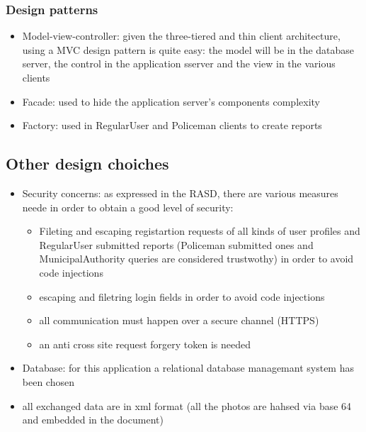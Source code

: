 \subsubsection{Design patterns}
\begin{itemize}
	\item Model-view-controller: given the three-tiered and thin client architecture, using a MVC design pattern is quite easy: the model will be in the database server, the control in the application sserver and the view in the various clients
	\item Facade: used to hide the application server's components complexity
	\item Factory: used in RegularUser and Policeman clients to create reports
\end{itemize}
\subsection{Other design choiches}
\begin{itemize}
	\item Security concerns: as expressed in the RASD, there are various measures neede in order to obtain a good level of security:
	\begin{itemize}
		\item Fileting and escaping registartion requests of all kinds of user profiles and RegularUser submitted reports (Policeman submitted ones and MunicipalAuthority queries are considered trustwothy) in order to avoid code injections
		\item escaping and filetring login fields in order to avoid code injections
		\item all communication must happen over a secure channel (HTTPS)
		\item an anti cross site request forgery token is needed 
	\end{itemize}
	\item Database: for this application a relational database managemant system has been chosen
	\item all exchanged data are in xml format (all the photos are hahsed via base 64 and embedded in the document)
\end{itemize}